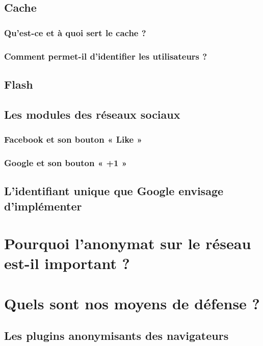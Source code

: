 \documentclass[a4paper,12pt,french]{report}
\begin{document}
\section{Cache}

\subsection{Qu'est-ce et à quoi sert le cache ?}

\subsection{Comment permet-il d'identifier les utilisateurs ?}

\section{Flash}

\section{Les modules des réseaux sociaux}

\subsection{Facebook et son bouton « Like »}

\subsection{Google et son bouton « +1 »}

\section{L'identifiant unique que Google envisage d'implémenter}

\chapter{Pourquoi l'anonymat sur le réseau est-il important ?}

\chapter{Quels sont nos moyens de défense ?}

\section{Les plugins anonymisants des navigateurs}
\end{document}
